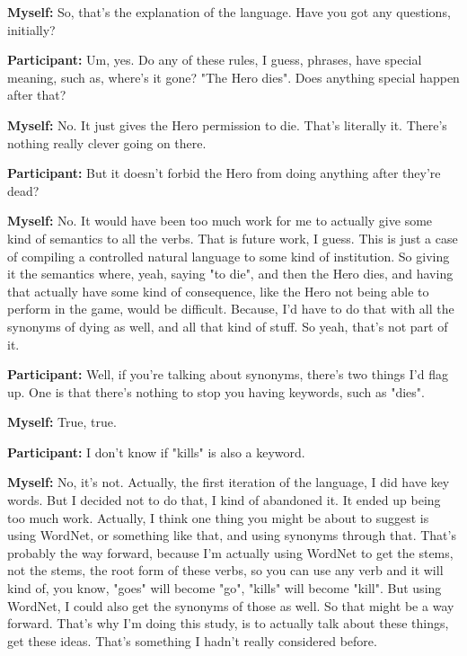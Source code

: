 \documentclass[11pt]{report}
\begin{document}
\begin{linenumbers}
\textbf{Myself:} So, that's the explanation of the language. Have you got any questions, initially?

\textbf{Participant:} Um, yes. Do any of these rules, I guess, phrases, have
special meaning, such as, where's it gone? "The Hero dies". Does anything
special happen after that?

\textbf{Myself:} No. It just gives the Hero permission to die. That's literally it. There's nothing really clever going on there.

\textbf{Participant:} But it doesn't forbid the Hero from doing anything after they're dead?

\textbf{Myself:} No. It would have been too much work for me to actually give some kind of semantics to all the verbs. That is future work, I guess. This is just a case of compiling a controlled natural language to some kind of institution. So giving it the semantics where, yeah, saying "to die", and then the Hero dies, and having that actually have some kind of consequence, like the Hero not being able to perform in the game, would be difficult. Because, I'd have to do that with all the synonyms of dying as well, and all that kind of stuff. So yeah, that's not part of it.

\textbf{Participant:} Well, if you're talking about synonyms, there's two things I'd flag up. One is that there's nothing to stop you having keywords, such as "dies".

\textbf{Myself:} True, true.

\textbf{Participant:} I don't know if "kills" is also a keyword.

\textbf{Myself:} No, it's not. Actually, the first iteration of the language, I did have key words. But I decided not to do that, I kind of abandoned it. It ended up being too much work. Actually, I think one thing you might be about to suggest is using WordNet, or something like that, and using synonyms through that. That's probably the way forward, because I'm actually using WordNet to get the stems, not the stems, the root form of these verbs, so you can use any verb and it will kind of, you know, "goes" will become "go", "kills" will become "kill". But using WordNet, I could also get the synonyms of those as well. So that might be a way forward. That's why I'm doing this study, is to actually talk about these things, get these ideas. That's something I hadn't really considered before.


\end{linenumbers}
\end{document}
